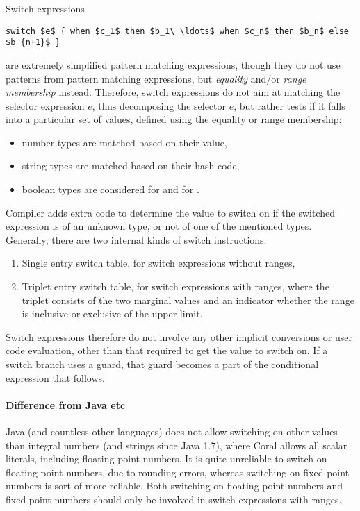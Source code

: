 Switch expressions 
\begin{lstlisting}
switch $e$ { when $c_1$ then $b_1\ \ldots$ when $c_n$ then $b_n$ else $b_{n+1}$ }
\end{lstlisting}
are extremely simplified pattern matching expressions, though they do not use patterns from pattern matching expressions, but {\em equality} and/or {\em range membership} instead. Therefore, switch expressions do not aim at matching the selector expression $e$, thus decomposing the selector $e$, but rather tests if it falls into a particular set of values, defined using the equality or range membership:
\begin{itemize}
  \item number types are matched based on their value,
  \item string types are matched based on their hash code,
  \item boolean types are considered  for  and  for .
\end{itemize}

Compiler adds extra code to determine the value to switch on if the switched expression is of an unknown type, or not of one of the mentioned types. Generally, there are two internal kinds of switch instructions:
\begin{enumerate}
  \item Single entry switch table, for switch expressions without ranges,
  \item Triplet entry switch table, for switch expressions with ranges, where the triplet consists of the two marginal values and an indicator whether the range is inclusive or exclusive of the upper limit. 
\end{enumerate}

Switch expressions therefore do not involve any other implicit conversions or user code evaluation, other than that required to get the value to switch on. If a switch branch uses a guard, that guard becomes a part of the conditional expression that follows. 

\paragraph{Difference from Java etc}
Java (and countless other languages) does not allow switching on other values than integral numbers (and strings since Java 1.7), where Coral allows all scalar literals, including floating point numbers. It is quite unreliable to switch on floating point numbers, due to rounding errors, whereas switching on fixed point numbers is sort of more reliable. Both switching on floating point numbers and fixed point numbers should only be involved in switch expressions with ranges. 

